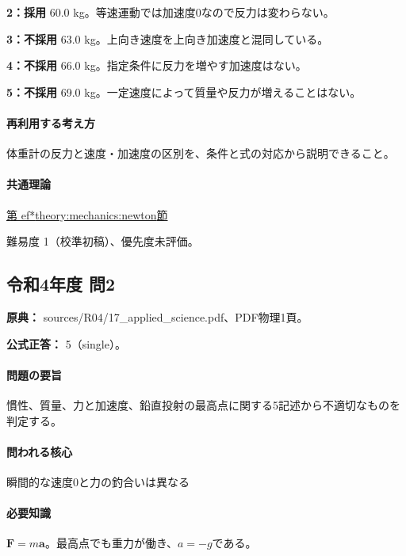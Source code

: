 \noindent\textbf{2：採用} 60.0 kg。等速運動では加速度0なので反力は変わらない。\par

\noindent\textbf{3：不採用} 63.0 kg。上向き速度を上向き加速度と混同している。\par

\noindent\textbf{4：不採用} 66.0 kg。指定条件に反力を増やす加速度はない。\par

\noindent\textbf{5：不採用} 69.0 kg。一定速度によって質量や反力が増えることはない。\par

\paragraph{再利用する考え方} 体重計の反力と速度・加速度の区別を、条件と式の対応から説明できること。

\paragraph{共通理論} \hyperref[theory:mechanics:newton]{第
ef*{theory:mechanics:newton}節}

\par 難易度 1（校準初稿）、優先度未評価。

\subsection{令和4年度 問2}
\label{q:r04-reg-applied-02}

\noindent\textbf{原典：} sources/R04/17\_applied\_science.pdf、PDF物理1頁。

\textbf{公式正答：} 5（single）。

\paragraph{問題の要旨} 慣性、質量、力と加速度、鉛直投射の最高点に関する5記述から不適切なものを判定する。

\paragraph{問われる核心} 瞬間的な速度0と力の釣合いは異なる

\paragraph{必要知識} \(\mathbf F=m\mathbf a\)。最高点でも重力が働き、\(a=-g\)である。


